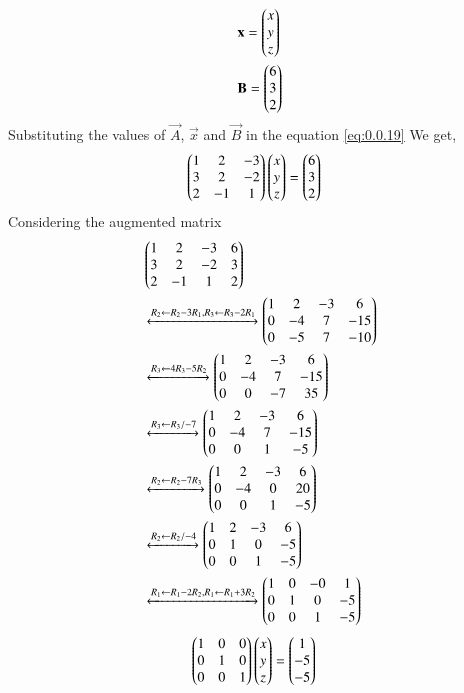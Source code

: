 \documentclass[journal,12pt,twocolumn]{IEEEtran}
\renewcommand\thesection{\arabic{section}}
\begin{document}
\begin{enumerate}[label=\thesection.\arabic*.,ref=\thesection.\theenumi]
\begin{align}
\medskip
&\vec{x}= \myvec{ x\\ y\\z}\\
\medskip
&\vec{B}= \myvec{6\\3\\2}
\end{align} 
Substituting the values of $\vec{A}$, $\vec{x}$ and $\vec{B}$ in the equation \eqref{eq:0.0.19}
We get,
\begin{align}
&\begin{pmatrix}1&2&-3\\3&2&-2\\2&-1&1\end{pmatrix} \begin{pmatrix}x\\y\\z\end{pmatrix}= \begin{pmatrix}6\\3\\2\end{pmatrix}
\end{align}
Considering the augmented matrix 
 \begin{align}
& \begin{pmatrix}1&2&-3&6\\3&2&-2&3\\2&-1&1&2\end{pmatrix}
 \\
&\xleftrightarrow[]{ R_2 \leftarrow R_2 - 3R_1 , R_3 \leftarrow R_3 - 2R_1}
\begin{pmatrix}1&2&-3&6\\0&-4&7&-15\\0&-5&7&-10\end{pmatrix}\\
 &\xleftrightarrow[]{ R_3 \leftarrow 4R_3 - 5R_2}
 \begin{pmatrix}1&2&-3&6\\0&-4&7&-15\\0&0&-7&35\end{pmatrix}\\
 &\xleftrightarrow[]{ R_3 \leftarrow R_3/-7}
 \begin{pmatrix}1&2&-3&6\\0&-4&7&-15\\0&0&1&-5\end{pmatrix}\\
 &\xleftrightarrow[]{ R_2 \leftarrow R_2-7R_3}
 \begin{pmatrix}1&2&-3&6\\0&-4&0&20\\0&0&1&-5\end{pmatrix}\\
 &\xleftrightarrow[]{ R_2 \leftarrow R_2/-4}
 \begin{pmatrix}1&2&-3&6\\0&1&0&-5\\0&0&1&-5\end{pmatrix}\\
 &\xleftrightarrow[]{ R_1 \leftarrow R_1-2R_2,R_1 \leftarrow R_1+3R_2}
 \begin{pmatrix}1&0&-0&1\\0&1&0&-5\\0&0&1&-5\end{pmatrix}
 \end{align}
 \begin{align}
&\myvec{1&0&0\\0&1&0\\0&0&1} \myvec{x\\y\\z}= \myvec{1\\-5\\-5}& \label{eq:0.0.30}

\end{align}
\end{enumerate}
\end{document}

